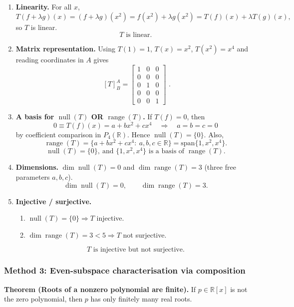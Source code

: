 \documentclass[12pt]{article}
\let\amsboxed\boxed
\renewcommand{\boxed}[1]{\amsboxed{\,#1\,}}
\begin{document}
\begin{enumerate}[label=(\alph*)]
\item \textbf{Linearity.}
For all $x$,
\[
T(f+\lambda g)(x)=(f+\lambda g)(x^2)=f(x^2)+\lambda g(x^2)=T(f)(x)+\lambda T(g)(x),
\]
so $T$ is linear.
\[
\boxed{\,T\text{ is linear.}\,}
\]

\item \textbf{Matrix representation.}
Using $T(1)=1$, $T(x)=x^2$, $T(x^2)=x^4$ and reading coordinates in $A$ gives
\[
\boxed{\, [T]_{B}^{A}=
\begin{bmatrix}
1&0&0\\
0&0&0\\
0&1&0\\
0&0&0\\
0&0&1
\end{bmatrix}\,}.
\]

\item \textbf{A basis for $\operatorname{null}(T)$ OR $\operatorname{range}(T)$.}
If $T(f)=0$, then
\[
0\equiv T(f)(x)=a+bx^2+cx^4\quad \Rightarrow\quad a=b=c=0
\]
by coefficient comparison in $P_4(\mathbb{R})$. Hence $\operatorname{null}(T)=\{0\}$.
Also,
\[
\operatorname{range}(T)=\{a+bx^2+cx^4:\ a,b,c\in\mathbb{R}\}=\mathrm{span}\{1,x^2,x^4\}.
\]
\[
\boxed{\,\operatorname{null}(T)=\{0\},\ \text{and }\{1,x^2,x^4\}\text{ is a basis of }\operatorname{range}(T).\,}
\]

\item \textbf{Dimensions.}
$\dim\operatorname{null}(T)=0$ and $\dim\operatorname{range}(T)=3$ (three free parameters $a,b,c$).
\[
\boxed{\,\dim\operatorname{null}(T)=0,\qquad \dim\operatorname{range}(T)=3.\,}
\]

\item \textbf{Injective / surjective.}
\begin{enumerate}[label=(\roman*)]
\item $\operatorname{null}(T)=\{0\}\Rightarrow T$ injective.
\item $\dim\operatorname{range}(T)=3<5\Rightarrow T$ not surjective.
\end{enumerate}
\[
\boxed{\,T\text{ is injective but not surjective.}\,}
\]
\end{enumerate}
\newpage
\subsubsection{Method 3: Even-subspace characterisation via composition}
\textbf{Theorem (Roots of a nonzero polynomial are finite).}
If $p\in\mathbb{R}[x]$ is not the zero polynomial, then $p$ has only finitely many real roots.
\end{document}
